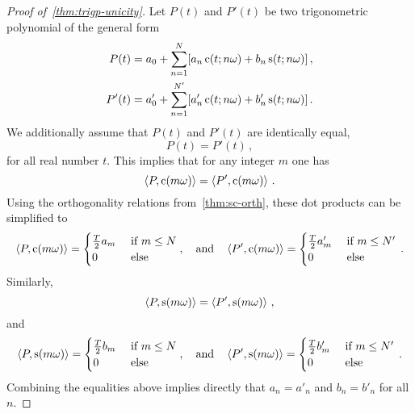 \begin{proof}[Proof of~\cref{thm:trigp-unicity}]
  Let $P(t)$ and $P'(t)$ be two trigonometric polynomial of the general form
  \begin{align}
    P(t)&=a_0+\sum_{n=1}^N[a_n\,\mathrm{c}(t;n\omega)+b_n\,\mathrm{s}(t;n\omega)]\,,\\
    P'(t)&=a'_0+\sum_{n=1}^{N'}[a'_n\,\mathrm{c}(t;n\omega)+b'_n\,\mathrm{s}(t;n\omega)]\,.
  \end{align}
  We additionally assume that $P(t)$ and $P'(t)$ are identically equal, \ie
  \begin{equation}
    P(t)=P'(t)\,,
  \end{equation}
  for all real number $t$. This implies that for any integer $m$ one has
  \begin{equation}
    \braket{P,\mathrm{c}(m\omega)}=\braket{P',\mathrm{c}(m\omega)}\,.
  \end{equation}
  Using the orthogonality relations from~\cref{thm:sc-orth}, these dot products can be
  simplified to
  \begin{equation}
    \braket{P,\mathrm{c}(m\omega)}=
    \begin{cases}
      \frac{T}{2}a_m&~\text{if}~m\leq N\\
      0&~\text{else}
    \end{cases},
    \quad\text{and}\quad
    \braket{P',\mathrm{c}(m\omega)}=
    \begin{cases}
      \frac{T}{2}a'_m&~\text{if}~m\leq N'\\
      0&~\text{else}
    \end{cases}\,.
  \end{equation}
  Similarly,
  \begin{equation}
    \braket{P,\mathrm{s}(m\omega)}=\braket{P',\mathrm{s}(m\omega)}\,,
  \end{equation}
  and
  \begin{equation}
    \braket{P,\mathrm{s}(m\omega)}=
    \begin{cases}
      \frac{T}{2}b_m&~\text{if}~m\leq N\\
      0&~\text{else}
    \end{cases},
    \quad\text{and}\quad
    \braket{P',\mathrm{s}(m\omega)}=
    \begin{cases}
      \frac{T}{2}b'_m&~\text{if}~m\leq N'\\
      0&~\text{else}
    \end{cases}\,.
  \end{equation}
  Combining the equalities above implies directly that $a_n=a'_n$ and $b_n=b'_n$ for all
  $n$.
\end{proof}

